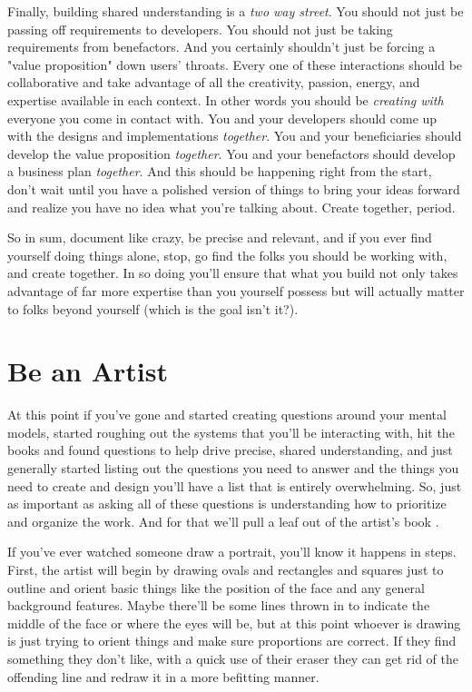 \documentclass[11pt]{book}
\begin{document}
Finally, building shared understanding is a \textit{two way street}. You should not just be passing off requirements to developers. You should not just be taking requirements from benefactors. And you certainly shouldn't just be forcing a "value proposition" down users' throats. Every one of these interactions should be collaborative and take advantage of all the creativity, passion, energy, and expertise available in each context. In other words you should be \textit{creating with} everyone you come in contact with. You and your developers should come up with the designs and implementations \textit{together}. You and your beneficiaries should develop the value proposition \textit{together}. You and your benefactors should develop a business plan \textit{together}. And this should be happening right from the start, don't wait until you have a polished version of things to bring your ideas forward and realize you have no idea what you're talking about. Create together, period.
\newline

So in sum, document like crazy, be precise and relevant, and if you ever find yourself doing things alone, stop, go find the folks you should be working with, and create together. In so doing you'll ensure that what you build not only takes advantage of far more expertise than you yourself possess but will actually matter to folks beyond yourself (which is the goal isn't it?).

\section{Be an Artist}
At this point if you've gone and started creating questions around your mental models, started roughing out the systems that you'll be interacting with, hit the books and found questions to help drive precise, shared understanding, and just generally started listing out the questions you need to answer and the things you need to create and design you'll have a list that is entirely overwhelming. So, just as important as asking all of these questions is understanding how to prioritize and organize the work. And for that we'll pull a leaf out of the artist's book \cite{patton}.
\newline

If you've ever watched someone draw a portrait, you'll know it happens in steps. First, the artist will begin by drawing ovals and rectangles and squares just to outline and orient basic things like the position of the face and any general background features. Maybe there'll be some lines thrown in to indicate the middle of the face or where the eyes will be, but at this point whoever is drawing is just trying to orient things and make sure proportions are correct. If they find something they don't like, with a quick use of their eraser they can get rid of the offending line and redraw it in a more befitting manner. 
\newline
\end{document}
